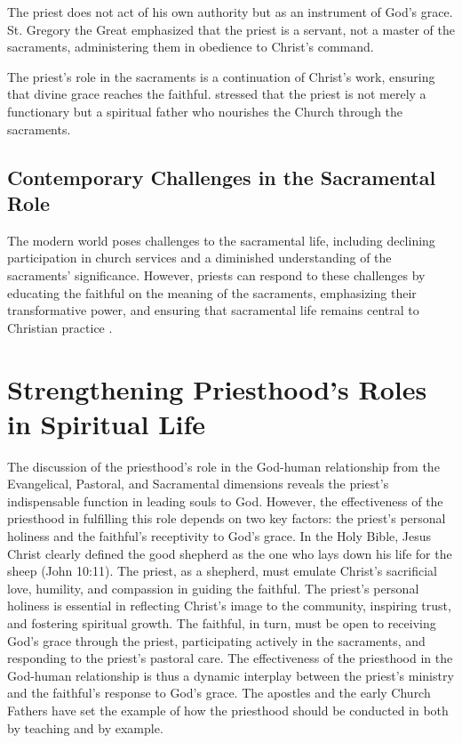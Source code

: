 \documentclass[12pt, doc]{apa7}   	%
\begin{document}
The priest does not act of his own authority but as an instrument of God’s grace. St. Gregory the Great \citep{early_church_akin} emphasized that the priest is a servant, not a master of the sacraments, administering them in obedience to Christ’s command.

The priest’s role in the sacraments is a continuation of Christ’s work, ensuring that divine grace reaches the faithful. \citet{priesthood_shenouda} stressed that the priest is not merely a functionary but a spiritual father who nourishes the Church through the sacraments.

\subsection{Contemporary Challenges in the Sacramental Role}

The modern world poses challenges to the sacramental life, including declining participation in church services and a diminished understanding of the sacraments’ significance. However, priests can respond to these challenges by educating the faithful on the meaning of the sacraments, emphasizing their transformative power, and ensuring that sacramental life remains central to Christian practice \citep{eucharist_schmemann}.

\section{Strengthening Priesthood's Roles in Spiritual Life}
The discussion of the priesthood’s role in the God-human relationship from the Evangelical, Pastoral, and Sacramental dimensions reveals the priest’s indispensable function in leading souls to God. However, the effectiveness of the priesthood in fulfilling this role depends on two key factors: the priest’s personal holiness and the faithful’s receptivity to God’s grace.  In the Holy Bible, Jesus Christ clearly defined the good shepherd as the one who lays down his life for the sheep (John 10:11).  The priest, as a shepherd, must emulate Christ’s sacrificial love, humility, and compassion in guiding the faithful.  The priest’s personal holiness is essential in reflecting Christ’s image to the community, inspiring trust, and fostering spiritual growth.  The faithful, in turn, must be open to receiving God’s grace through the priest, participating actively in the sacraments, and responding to the priest’s pastoral care.  The effectiveness of the priesthood in the God-human relationship is thus a dynamic interplay between the priest’s ministry and the faithful’s response to God’s grace.  The apostles and the early Church Fathers have set the example of how the priesthood should be conducted in both by teaching and by example. 
\end{document}
